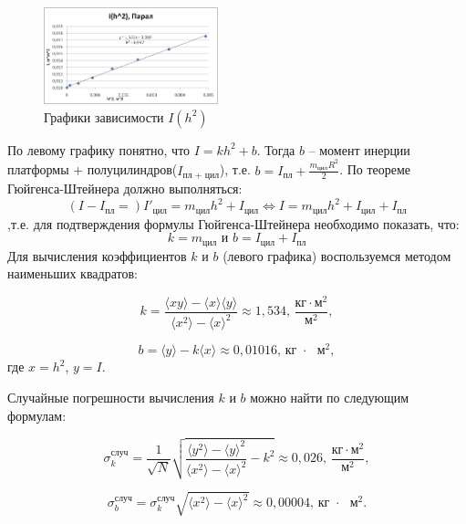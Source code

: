 \documentclass[a4paper,14pt]{extarticle}
\begin{document}
	\begin{figure}[!h]
		\begin{center}
			\includegraphics[width=0.45\textwidth]{graph}
			\caption{Графики зависимости $ I(h^2) $}
			\label{ris:grafik}
		\end{center}
	\end{figure}
	
	По левому графику понятно, что $I = kh^2 + b$. 
	Тогда $b$ -- момент инерции платформы + полуцилиндров($I_\text{пл + цил}$), т.е. $b = I_\text{пл} + \frac{m_\text{цил} R^2}{2}$. 
	\newpage
	По теореме Гюйгенса-Штейнера должно выполняться:
	$$(I - I_\text{пл} =) I'_\text{цил} = m_\text{цил} h^2 + I_\text{цил} \Leftrightarrow I = m_\text{цил} h^2 + I_\text{цил} + I_\text{пл} $$
	,т.е. для подтверждения формулы Гюйгенса-Штейнера необходимо показать, что:
	$$k = m_\text{цил} \text{ и } b = I_\text{цил} + I_\text{пл}$$
	Для вычисления коэффициентов $ k $ и $ b $ (левого графика) воспользуемся методом наименьших квадратов:
	
	\begin{equation}
		k=\frac{\langle xy\rangle-\langle x\rangle \langle y\rangle}{\langle x^2\rangle - \langle x\rangle^2}\approx 1,534\text{, } \frac{\text{кг}\cdot\text{м}^2}{\text{м}^2},
	\end{equation}
	
	\begin{equation}
		b=\langle y \rangle -k\langle x \rangle\approx 0,01016\text{,  кг $\cdot$ $\text{м}^2$},
	\end{equation}
	где $ x=h^2 $, $ y=I $.
	
	Случайные погрешности вычисления $ k $ и $ b $ можно найти по следующим формулам:
	
	\begin{equation}
		\sigma_k^\text{случ}=\frac{1}{\sqrt{N}}\sqrt{\frac{\langle y^2 \rangle - \langle y \rangle^2}{\langle x^2 \rangle - \langle x \rangle^2} - k^2  } \approx 0,026
		\text{, } \frac{\text{кг}\cdot\text{м}^2}{\text{м}^2},
	\end{equation}
	
	\begin{equation}
		\sigma_b^\text{случ}= \sigma_k^\text{случ} \sqrt{\langle x^2 \rangle - \langle x \rangle^2} \approx 0,00004
		\text{,  кг $\cdot$ $\text{м}^2$}.
	\end{equation}
	
\end{document}
